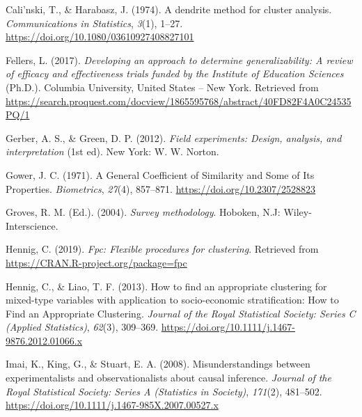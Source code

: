 \documentclass[
  english,
  man,floatsintext]{apa6}
\newlength{\cslhangindent}
\newlength{\cslentryspacingunit} %
\newenvironment{CSLReferences}[2] %
 {%
  \setlength{\parindent}{0pt}
  \ifodd #1
  \let\oldpar\par
  \def\par{\hangindent=\cslhangindent\oldpar}
  \fi
  \setlength{\parskip}{#2\cslentryspacingunit}
 }%
 {}
\begin{document}
\begingroup
\setlength{\parindent}{-0.5in}
\setlength{\leftskip}{0.5in}

\hypertarget{refs}{}
\begin{CSLReferences}{1}{0}
\leavevmode{}%
Cali'nski, T., \& Harabasz, J. (1974). A dendrite method for cluster analysis. \emph{Communications in Statistics}, \emph{3}(1), 1--27. \url{https://doi.org/10.1080/03610927408827101}

\leavevmode{}%
Fellers, L. (2017). \emph{Developing an approach to determine generalizability: {A} review of efficacy and effectiveness trials funded by the {Institute} of {Education Sciences}} (Ph.D.). {Columbia University}, {United States -- New York}. Retrieved from \url{https://search.proquest.com/docview/1865595768/abstract/40FD82F4A0C24535PQ/1}

\leavevmode{}%
Gerber, A. S., \& Green, D. P. (2012). \emph{Field experiments: Design, analysis, and interpretation} (1st ed). New York: {W. W. Norton}.

\leavevmode{}%
Gower, J. C. (1971). A {General Coefficient} of {Similarity} and {Some} of {Its Properties}. \emph{Biometrics}, \emph{27}(4), 857--871. \url{https://doi.org/10.2307/2528823}

\leavevmode{}%
Groves, R. M. (Ed.). (2004). \emph{Survey methodology}. Hoboken, N.J: {Wiley-Interscience}.

\leavevmode{}%
Hennig, C. (2019). \emph{Fpc: Flexible procedures for clustering}. Retrieved from \url{https://CRAN.R-project.org/package=fpc}

\leavevmode{}%
Hennig, C., \& Liao, T. F. (2013). How to find an appropriate clustering for mixed-type variables with application to socio-economic stratification: {How} to {Find} an {Appropriate Clustering}. \emph{Journal of the Royal Statistical Society: Series C (Applied Statistics)}, \emph{62}(3), 309--369. \url{https://doi.org/10.1111/j.1467-9876.2012.01066.x}

\leavevmode{}%
Imai, K., King, G., \& Stuart, E. A. (2008). Misunderstandings between experimentalists and observationalists about causal inference. \emph{Journal of the Royal Statistical Society: Series A (Statistics in Society)}, \emph{171}(2), 481--502. \url{https://doi.org/10.1111/j.1467-985X.2007.00527.x}


\end{CSLReferences}
\end{document}
